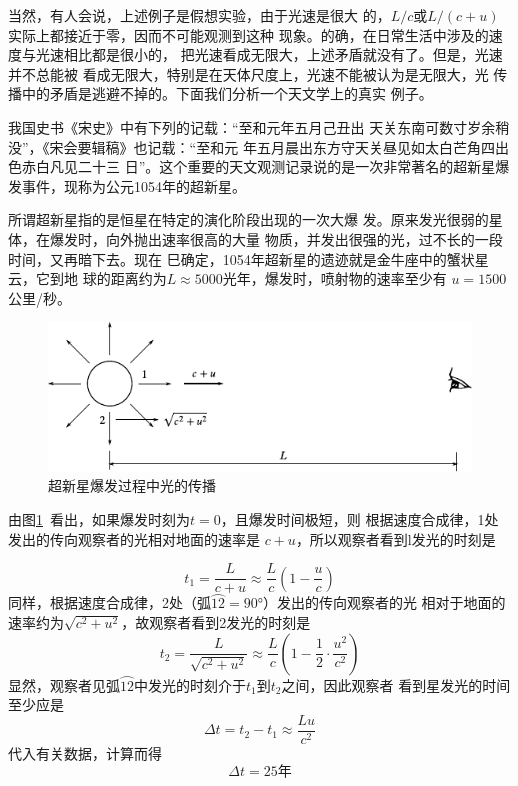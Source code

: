 当然，有人会说，上述例子是假想实验，由于光速是很大
的，$L/c$或$L/\left(c+u\right)$实际上都接近于零，因而不可能观测到这种
现象。的确，在日常生活中涉及的速度与光速相比都是很小的，
把光速看成无限大，上述矛盾就没有了。但是，光速并不总能被
看成无限大，特别是在天体尺度上，光速不能被认为是无限大，光
传播中的矛盾是逃避不掉的。下面我们分析一个天文学上的真实
例子。

我国史书《宋史》中有下列的记载：“至和元年五月己丑出
天关东南可数寸岁余稍没”，《宋会要辑稿》也记载：“至和元
年五月晨出东方守天关昼见如太白芒角四出色赤白凡见二十三
日”。这个重要的天文观测记录说的是一次非常著名的超新星爆
发事件，现称为公元1054年的超新星。

所谓超新星指的是恒星在特定的演化阶段出现的一次大爆
发。原来发光很弱的星体，在爆发时，向外抛出速率很高的大量
物质，并发出很强的光，过不长的一段时间，又再暗下去。现在
巳确定，1054年超新星的遗迹就是金牛座中的蟹状星云，它到地
球的距离约为$L \approx 5000$光年，爆发时，喷射物的速率至少有
$u=1500$公里/秒。
\vspace{1em}
\begin{figure}[h]
  \centering
  \includegraphics{figure/fig02.13}
  \caption{超新星爆发过程中光的传播}
  \label{fig:02.13}
\end{figure}

由图\ref{fig:02.13}~看出，如果爆发时刻为$t=0$，且爆发时间极短，则
根据速度合成律，1处发出的传向观察者的光相对地面的速率是
$c+u$，所以观察者看到l发光的时刻是

\begin{equation*}
  t_{1}=\frac{L}{c+u} \approx \frac{L}{c}\left(1-\frac{u}{c}\right)
\end{equation*}
同样，根据速度合成律，2处（弧$\wideparen{12}=\ang{90;;}$）发出的传向观察者的光
相对于地面的速率约为$\sqrt{c^2 + u^2}$，故观察者看到2发光的时刻是
\begin{equation*}
  t_{2}=\frac{L}{\sqrt{c^{2}+u^{2}}} \approx \frac{L}{c}\left(1-\frac{1}{2} \cdot \frac{u^{2}}{c^{2}}\right)
\end{equation*}
显然，观察者见弧$\wideparen{12}$中发光的时刻介于$t_1$到$t_2$之间，因此观察者
看到星发光的时间至少应是
\begin{equation*}
  \Delta t=t_{2}-t_{1} \approx \frac{Lu}{c^{2}}
\end{equation*}
代入有关数据，计算而得
\begin{equation*}
  \Delta t=25\text{年}
\end{equation*}

